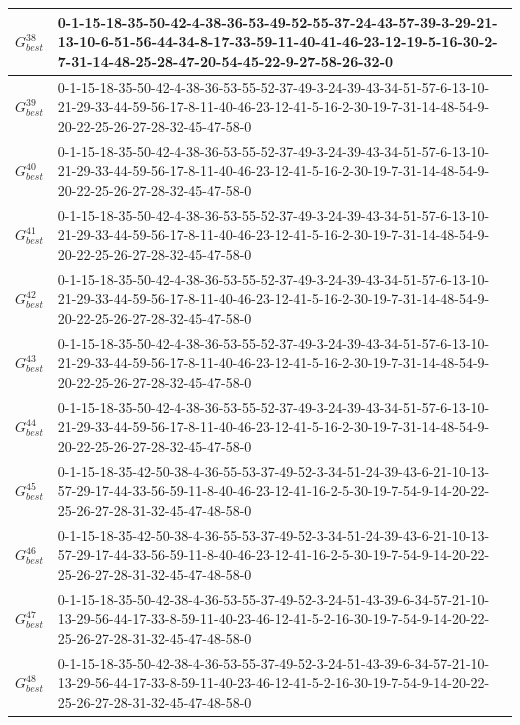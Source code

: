 \begin{landscape}
{\begin{tabularx}{\linewidth}{|c|X|}
        $G_{best}^{38}$  & 0-1-15-18-35-50-42-4-38-36-53-49-52-55-37-24-43-57-39-3-29-21-13-10-6-51-56-44-34-8-17-33-59-11-40-41-46-23-12-19-5-16-30-2-7-31-14-48-25-28-47-20-54-45-22-9-27-58-26-32-0 \\ \hline
        $G_{best}^{39}$  & 0-1-15-18-35-50-42-4-38-36-53-55-52-37-49-3-24-39-43-34-51-57-6-13-10-21-29-33-44-59-56-17-8-11-40-46-23-12-41-5-16-2-30-19-7-31-14-48-54-9-20-22-25-26-27-28-32-45-47-58-0 \\ \hline
        $G_{best}^{40}$  & 0-1-15-18-35-50-42-4-38-36-53-55-52-37-49-3-24-39-43-34-51-57-6-13-10-21-29-33-44-59-56-17-8-11-40-46-23-12-41-5-16-2-30-19-7-31-14-48-54-9-20-22-25-26-27-28-32-45-47-58-0 \\ \hline
        $G_{best}^{41}$  & 0-1-15-18-35-50-42-4-38-36-53-55-52-37-49-3-24-39-43-34-51-57-6-13-10-21-29-33-44-59-56-17-8-11-40-46-23-12-41-5-16-2-30-19-7-31-14-48-54-9-20-22-25-26-27-28-32-45-47-58-0 \\ \hline
        $G_{best}^{42}$  & 0-1-15-18-35-50-42-4-38-36-53-55-52-37-49-3-24-39-43-34-51-57-6-13-10-21-29-33-44-59-56-17-8-11-40-46-23-12-41-5-16-2-30-19-7-31-14-48-54-9-20-22-25-26-27-28-32-45-47-58-0 \\ \hline
        $G_{best}^{43}$  & 0-1-15-18-35-50-42-4-38-36-53-55-52-37-49-3-24-39-43-34-51-57-6-13-10-21-29-33-44-59-56-17-8-11-40-46-23-12-41-5-16-2-30-19-7-31-14-48-54-9-20-22-25-26-27-28-32-45-47-58-0 \\ \hline
        $G_{best}^{44}$  & 0-1-15-18-35-50-42-4-38-36-53-55-52-37-49-3-24-39-43-34-51-57-6-13-10-21-29-33-44-59-56-17-8-11-40-46-23-12-41-5-16-2-30-19-7-31-14-48-54-9-20-22-25-26-27-28-32-45-47-58-0 \\ \hline
        $G_{best}^{45}$  & 0-1-15-18-35-42-50-38-4-36-55-53-37-49-52-3-34-51-24-39-43-6-21-10-13-57-29-17-44-33-56-59-11-8-40-46-23-12-41-16-2-5-30-19-7-54-9-14-20-22-25-26-27-28-31-32-45-47-48-58-0 \\ \hline
        $G_{best}^{46}$  & 0-1-15-18-35-42-50-38-4-36-55-53-37-49-52-3-34-51-24-39-43-6-21-10-13-57-29-17-44-33-56-59-11-8-40-46-23-12-41-16-2-5-30-19-7-54-9-14-20-22-25-26-27-28-31-32-45-47-48-58-0 \\ \hline
        $G_{best}^{47}$  & 0-1-15-18-35-50-42-38-4-36-53-55-37-49-52-3-24-51-43-39-6-34-57-21-10-13-29-56-44-17-33-8-59-11-40-23-46-12-41-5-2-16-30-19-7-54-9-14-20-22-25-26-27-28-31-32-45-47-48-58-0 \\ \hline
        $G_{best}^{48}$  & 0-1-15-18-35-50-42-38-4-36-53-55-37-49-52-3-24-51-43-39-6-34-57-21-10-13-29-56-44-17-33-8-59-11-40-23-46-12-41-5-2-16-30-19-7-54-9-14-20-22-25-26-27-28-31-32-45-47-48-58-0 \\ \hline

\end{tabularx}}
\end{landscape}
